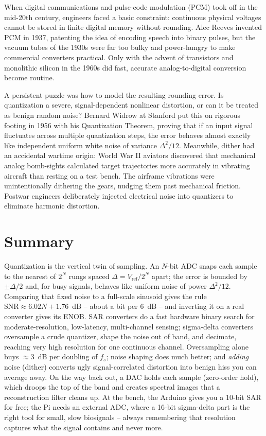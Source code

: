 \begin{historybox}
When digital communications and pulse-code modulation (PCM) took off in the mid-20th century,
engineers faced a basic constraint: continuous physical voltages cannot be stored
in finite digital memory without rounding. Alec Reeves invented PCM in 1937, patenting the idea of
encoding speech into binary pulses, but the vacuum tubes of the 1930s were far too bulky and power-hungry
to make commercial converters practical. Only with the advent of transistors and monolithic silicon
in the 1960s did fast, accurate analog-to-digital conversion become routine.

A persistent puzzle was how to model the resulting rounding error. Is quantization a severe,
signal-dependent nonlinear distortion, or can it be treated as benign random noise? Bernard Widrow
at Stanford put this on rigorous footing in 1956 with his Quantization Theorem, proving that if an
input signal fluctuates across multiple quantization steps, the error behaves almost exactly like
independent uniform white noise of variance $\Delta^2/12$. Meanwhile, dither had an accidental wartime
origin: World War II aviators discovered that mechanical analog bomb-sights calculated target trajectories
more accurately in vibrating aircraft than resting on a test bench. The airframe vibrations were
unintentionally dithering the gears, nudging them past mechanical friction. Postwar engineers deliberately
injected electrical noise into quantizers to eliminate harmonic distortion.
\end{historybox}

\section{Summary}
\label{ch19:summary}

Quantization is the vertical twin of sampling. An $N$-bit ADC snaps each sample to the nearest of
$2^N$ rungs spaced $\Delta = V_{\mathrm{ref}}/2^N$ apart; the error is bounded by $\pm\Delta/2$
and, for busy signals, behaves like uniform noise of power $\Delta^2/12$. Comparing that fixed
noise to a full-scale sinusoid gives the rule
$\mathrm{SNR}\approx 6.02N + 1.76$~dB -- about a bit per 6~dB -- and inverting it on a real
converter gives its ENOB. SAR converters do a fast hardware binary search for moderate-resolution,
low-latency, multi-channel sensing; sigma-delta converters oversample a crude quantizer, shape the
noise out of band, and decimate, reaching very high resolution for one continuous channel.
Oversampling alone buys $\approx 3$~dB per doubling of $f_s$; noise shaping does much better; and
\emph{adding} noise (dither) converts ugly signal-correlated distortion into benign hiss you can
average away. On the way back out, a DAC holds each sample (zero-order hold), which droops the top
of the band and creates spectral images that a reconstruction filter cleans up. At the bench, the
Arduino gives you a 10-bit SAR for free; the Pi needs an external ADC, where a 16-bit sigma-delta
part is the right tool for small, slow biosignals -- always remembering that resolution captures
what the signal contains and never more.

